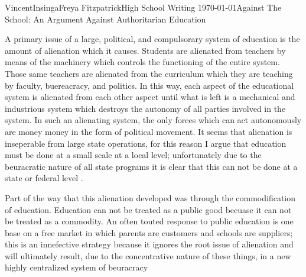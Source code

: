 \documentclass[12pt,letterpaper]{article}
\begin{document}
\begin{mla}{Vincent}{Insinga}{Freya Fitzpatrick}{High School Writing}%
  {\today}{Against The School: An Argument Against Authoritarian Education}     

  A primary issue of a large, political, and compulsorary system of
  education is the amount of alienation which it causes. Students are alienated
  from teachers by means of the machinery which controls the functioning of the
  entire system. Those same teachers are alienated from the curriculum which
  they are teaching by faculty, buereacracy, and politics. In this way, each
  aspect of the educational system is alienated from each other
  aspect until what is left is a mechanical and industrious system which
  destroys the autonomy of all parties involved in the system. In such an
  alienating system, the only forces which can act autonomously are money money
  in the form of political movement. It seems that alienation is inseperable
  from large state operations, for this reason I argue that education must be
  done at a small scale at a local level; unfortunately due to the beuracratic
  nature of all state programs it is clear that this can not be done at a state
  or federal level \autocite{atl}.

  Part of the way that this alienation developed was through the
  commodification of education. Education can not be treated as a public good
  becuase it can not be treated as a commodity. An often touted response to
  public education is one base on a free market in which parents are customers
  and schools are suppliers; this is an innefective strategy because it ignores
  the root issue of alienation and will ultimately result, due to the
  concentrative nature of these things, in a new highly centralized system of
  beuracracy

\printbibliography
\end{mla}
\end{document}

